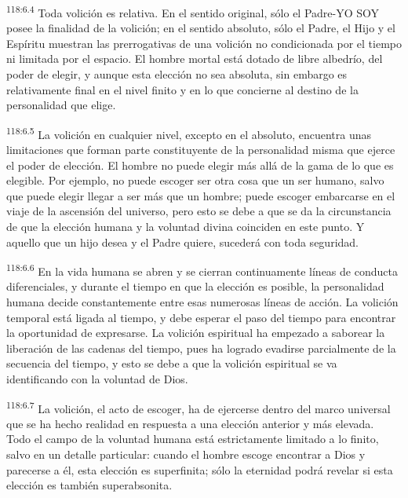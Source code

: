 \par
\textsuperscript{118:6.4} Toda volición es relativa. En el sentido original, sólo el Padre-YO SOY posee la finalidad de la volición; en el sentido absoluto, sólo el Padre, el Hijo y el Espíritu muestran las prerrogativas de una volición no condicionada por el tiempo ni limitada por el espacio. El hombre mortal está dotado de libre albedrío, del poder de elegir, y aunque esta elección no sea absoluta, sin embargo es relativamente final en el nivel finito y en lo que concierne al destino de la personalidad que elige.

\par
\textsuperscript{118:6.5} La volición en cualquier nivel, excepto en el absoluto, encuentra unas limitaciones que forman parte constituyente de la personalidad misma que ejerce el poder de elección. El hombre no puede elegir más allá de la gama de lo que es elegible. Por ejemplo, no puede escoger ser otra cosa que un ser humano, salvo que puede elegir llegar a ser más que un hombre; puede escoger embarcarse en el viaje de la ascensión del universo, pero esto se debe a que se da la circunstancia de que la elección humana y la voluntad divina coinciden en este punto. Y aquello que un hijo desea y el Padre quiere, sucederá con toda seguridad.

\par
\textsuperscript{118:6.6} En la vida humana se abren y se cierran continuamente líneas de conducta diferenciales, y durante el tiempo en que la elección es posible, la personalidad humana decide constantemente entre esas numerosas líneas de acción. La volición temporal está ligada al tiempo, y debe esperar el paso del tiempo para encontrar la oportunidad de expresarse. La volición espiritual ha empezado a saborear la liberación de las cadenas del tiempo, pues ha logrado evadirse parcialmente de la secuencia del tiempo, y esto se debe a que la volición espiritual se va identificando con la voluntad de Dios.

\par
\textsuperscript{118:6.7} La volición, el acto de escoger, ha de ejercerse dentro del marco universal que se ha hecho realidad en respuesta a una elección anterior y más elevada. Todo el campo de la voluntad humana está estrictamente limitado a lo finito, salvo en un detalle particular: cuando el hombre escoge encontrar a Dios y parecerse a él, esta elección es superfinita; sólo la eternidad podrá revelar si esta elección es también superabsonita.

